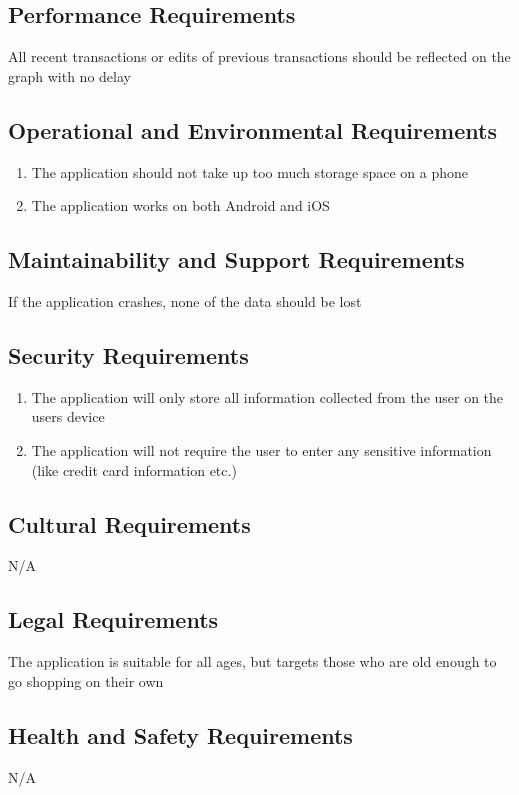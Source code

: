 \documentclass[12pt, titlepage]{article}
\begin{document}
\subsection{Performance Requirements}
All recent transactions or edits of previous transactions should be reflected on the graph with no delay %

\subsection{Operational and Environmental Requirements}
   \begin{enumerate}
     \item The application should not take up too much storage space on a phone %
     \item The application works on both Android and iOS
   \end{enumerate}

\subsection{Maintainability and Support Requirements}
If the application crashes, none of the data should be lost %

\subsection{Security Requirements}
   \begin{enumerate}
     \item The application will only store all information collected from the user on the users device 
     \item The application will not require the user to enter any sensitive information (like credit card information etc.)
   \end{enumerate}
\subsection{Cultural Requirements}
N/A
\subsection{Legal Requirements}
 The application is suitable for all ages, but targets those who are old enough to go shopping on their own
\subsection{Health and Safety Requirements}
N/A
\end{document}
